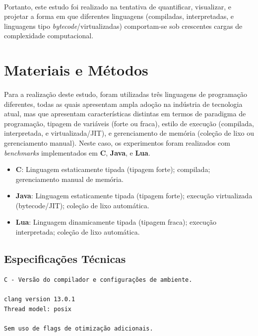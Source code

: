 \documentclass[11pt]{article}
\begin{document}
\paragraph{}
Portanto, este estudo foi realizado na tentativa de quantificar, visualizar, e
projetar a forma em que diferentes linguagens (compiladas, interpretadas, e
linguagens tipo \textit{bytecode}/virtualizadas) comportam-se sob crescentes
cargas de complexidade computacional.

\newpage
\section{Materiais e Métodos}
\paragraph{}
Para a realização deste estudo, foram utilizadas três linguagens de programação
diferentes, todas as quais apresentam ampla adoção na indústria de tecnologia
atual\cite{cass20152015}, mas que apresentam características distintas em termos de paradigma de
programação, tipagem de variáveis (forte ou fraca), estilo de execução
(compilada, interpretada, e virtualizada/JIT), e gerenciamento de memória
(coleção de lixo ou gerenciamento manual). Neste caso, os experimentos foram
realizados com \textit{benchmarks} implementados em \textbf{C}, \textbf{Java}, e
\textbf{Lua}.

\begin{itemize}
    \item \textbf{C}: Linguagem estaticamente tipada 
        (tipagem forte); compilada; gerenciamento manual de memória.
    \item \textbf{Java}: Linguagem estaticamente tipada (tipagem forte);
        execução virtualizada (bytecode/JIT); coleção de lixo automática.
    \item \textbf{Lua}: Linguagem dinamicamente tipada (tipagem fraca);
        execução interpretada; coleção de lixo automática.
\end{itemize}

\subsection{Especificações Técnicas}

\begin{verbatim}
C - Versão do compilador e configurações de ambiente.

clang version 13.0.1
Thread model: posix

Sem uso de flags de otimização adicionais.
\end{verbatim}
\end{document}
